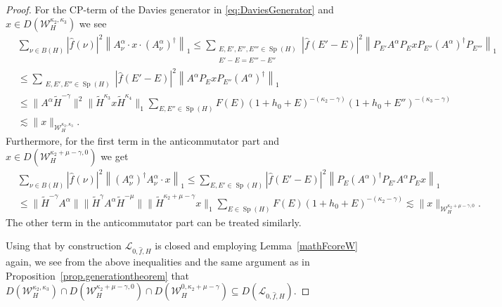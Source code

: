 \documentclass[11pt]{amsart}
\newcommand{\1}{\mathbbm{1}}
\newcommand{\spec}{\operatorname{Sp}}
\newcommand{\bin}[1]{}
\theoremstyle{plain}
\theoremstyle{definition}
\theoremstyle{remark}
\numberwithin{equation}{section}
\begin{document}
\begin{proof}
\bin{\begin{align*}
\mathcal{L}_{0,\widehat{f},H}(x)&=\sum_{\substack{E,E',E'',E'''\in\spec(H)\\ E'-E=E'''-E''}}|\widehat f(E'-E)|^2
P_{E'}A^{\alpha}P_ExP_{E''} (A^{\alpha})^{\dagger}P_{E'''}\\\quad&-\sum_{E,E'\in\spec(H)}|\widehat f(E'-E)|^2\frac{P_{E}(A^{\alpha})^{\dagger}P_{E'}A^{\alpha}P_Ex+xP_{E}(A^{\alpha})^{\dagger}P_{E'}A^{\alpha}P_E}{2}.
\end{align*}}
For the CP-term of the Davies generator in \eqref{eq:DaviesGenerator} and $x\in D(\mathcal{W}^{\kappa_2,\kappa_3}_H)$ we see
\begin{align*}
&\sum_{\nu\in B(H)}|\widehat f(\nu)|^2 \left\|A^{\alpha}_{\nu}\cdot x\cdot \left(A^{\alpha}_\nu\right)^{\dagger}\right\|_1 \le 
\sum_{\substack{E,E',E'',E'''\in\spec(H)\\ E'-E=E'''-E''}}|\widehat f(E'-E)|^2
\left\|P_{E'}A^{\alpha}P_ExP_{E''} (A^{\alpha})^{\dagger}P_{E'''} \right\|_1\\& \le  \sum_{\substack{E,E',E''\in\spec(H)}}|\widehat f(E'-E)|^2
\left\|A^{\alpha}P_ExP_{E''} (A^{\alpha})^{\dagger} \right\|_1\\&\le\|A^\alpha \widetilde H^{-\gamma}\|^2\|\widetilde H^{\kappa_3}x\widetilde H^{\kappa_4}\|_1 \sum_{E,E''\in \spec(H)} F(E) \left(1+h_0+E\right)^{-(\kappa_2-\gamma)} \left(1+h_0+E''\right)^{-(\kappa_3-\gamma)} \\
&\lesssim \|x\|_{\mathcal{W}^{\kappa_2,\kappa_3}_H}.
\end{align*}
Furthermore, for the first term in the anticommutator part and $x\in D(\mathcal{W}^{\kappa_2+\mu-\gamma,0}_H)$ we get
\begin{align*}
    &\sum_{\nu\in B(H)}|\widehat f(\nu)|^2\left\|(A_\nu^{\alpha})^{\dagger}A_\nu^{\alpha}\cdot x\right\|_1\le \sum_{E,E'\in \spec(H)}|\widehat f(E'-E)|^2\left\|P_{E}(A^{\alpha})^{\dagger}P_{E'}A^{\alpha}P_Ex\right\|_1 \\&\le\|\widetilde H^{-\gamma}A^{\alpha}\| \|\widetilde H^{\gamma}A^{\alpha}\widetilde H^{-\mu}\|\|\widetilde H^{\kappa_2+\mu-\gamma}x\|_1 \sum_{E\in\spec(H)} F(E) \left(1+h_0+E\right)^{-(\kappa_2-\gamma)} \lesssim\|x\|_{\mathcal{W}^{\kappa_2+\mu-\gamma,0}_H}.
\end{align*}
The other term in the anticommutator part can be treated similarly. 

Using that by construction $\mathcal{L}_{0,\widehat f,H}$ is closed and employing Lemma~\ref{mathFcoreW} again, we see from the above inequalities and the same argument as in  Proposition~\ref{prop.generationtheorem} that $D(\mathcal{W}_H^{\kappa_2,\kappa_3})\cap D(\mathcal{W}_H^{\kappa_2+\mu-\gamma,0})\cap D(\mathcal{W}_H^{0,\kappa_2+\mu-\gamma})\subseteq D(\mathcal{L}_{0,\widehat{f},H}).$  
\end{proof}
\end{document}
